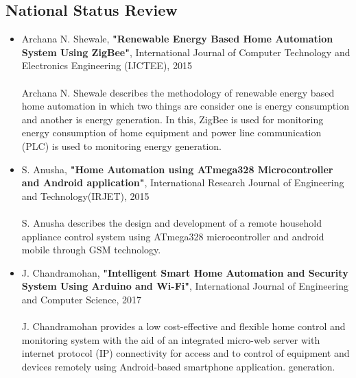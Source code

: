         	\subsection{National Status Review}
        	\begin{itemize}
        		\item Archana N. Shewale, \textbf{"Renewable Energy Based Home Automation System Using ZigBee"}, International Journal of Computer Technology and Electronics Engineering (IJCTEE), 2015\\ \\
        		Archana N. Shewale describes the methodology of renewable energy based home automation in which two things are consider one is energy consumption and another is energy generation. In this, ZigBee is used for monitoring energy consumption of home equipment and power line communication (PLC) is used to monitoring energy generation.
        		\item S. Anusha, \textbf{"Home Automation using ATmega328 Microcontroller and Android application"}, International Research Journal of Engineering and Technology(IRJET), 2015\\ \\
        		S. Anusha describes the design and development of a remote household appliance control system using ATmega328 microcontroller and android mobile through GSM technology.
        		\item J. Chandramohan, \textbf{"Intelligent Smart Home Automation and Security System Using Arduino and Wi-Fi"}, International Journal of Engineering and Computer Science, 2017\\ \\
        		J. Chandramohan provides a low cost-effective and flexible home control and monitoring system with the aid of an integrated micro-web server with internet protocol (IP) connectivity for access and to control of equipment and devices remotely using Android-based smartphone application. generation.
        	\end{itemize}
